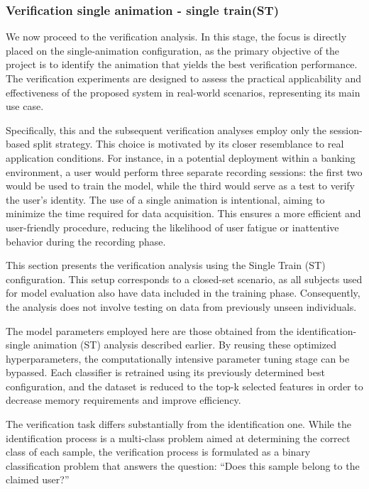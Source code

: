 \documentclass{article}
\begin{document}
\subsubsection{Verification single animation - single train(ST)}

We now proceed to the verification analysis.
In this stage, the focus is directly placed on the single-animation configuration, as the primary objective of the project is to identify the animation that yields the best verification performance.
The verification experiments are designed to assess the practical applicability and effectiveness of the proposed system in real-world scenarios, representing its main use case.

Specifically, this and the subsequent verification analyses employ only the session-based split strategy.
This choice is motivated by its closer resemblance to real application conditions.
For instance, in a potential deployment within a banking environment, a user would perform three separate recording sessions: the first two would be used to train the model, while the third would serve as a test to verify the user's identity.
The use of a single animation is intentional, aiming to minimize the time required for data acquisition.
This ensures a more efficient and user-friendly procedure, reducing the likelihood of user fatigue or inattentive behavior during the recording phase.

This section presents the verification analysis using the Single Train (ST) configuration.
This setup corresponds to a closed-set scenario, as all subjects used for model evaluation also have data included in the training phase.
Consequently, the analysis does not involve testing on data from previously unseen individuals.

The model parameters employed here are those obtained from the identification-single animation (ST) analysis described earlier.
By reusing these optimized hyperparameters, the computationally intensive parameter tuning stage can be bypassed.
Each classifier is retrained using its previously determined best configuration, and the dataset is reduced to the top-k selected features in order to decrease memory requirements and improve efficiency.

The verification task differs substantially from the identification one.
While the identification process is a multi-class problem aimed at determining the correct class of each sample, the verification process is formulated as a binary classification problem that answers the question: “Does this sample belong to the claimed user?”
\end{document}
